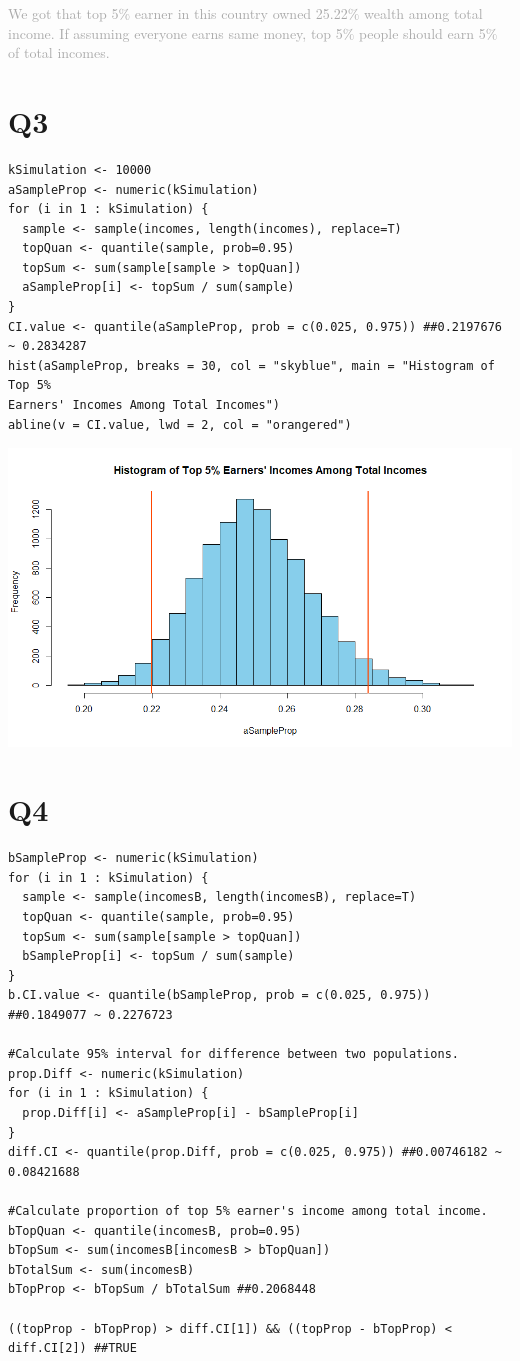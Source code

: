 \documentclass[12pt]{article}
\begin{document}
\noindent \textcolor{darkgray}{We got that top 5$\%$ earner in this country owned 25.22$\%$ wealth among total income. If assuming everyone earns same money, top 5$\%$ people should earn 5$\%$ of total incomes.}

\section*{Q3}
\begin{verbatim}
kSimulation <- 10000
aSampleProp <- numeric(kSimulation)
for (i in 1 : kSimulation) {
  sample <- sample(incomes, length(incomes), replace=T)
  topQuan <- quantile(sample, prob=0.95)
  topSum <- sum(sample[sample > topQuan])
  aSampleProp[i] <- topSum / sum(sample)
}
CI.value <- quantile(aSampleProp, prob = c(0.025, 0.975)) ##0.2197676 ~ 0.2834287
hist(aSampleProp, breaks = 30, col = "skyblue", main = "Histogram of Top 5% 
Earners' Incomes Among Total Incomes")
abline(v = CI.value, lwd = 2, col = "orangered")
\end{verbatim}

\includegraphics[width=6.5in]{Hist-top005.png}

\section*{Q4}
\begin{verbatim}
bSampleProp <- numeric(kSimulation) 
for (i in 1 : kSimulation) {
  sample <- sample(incomesB, length(incomesB), replace=T)
  topQuan <- quantile(sample, prob=0.95)
  topSum <- sum(sample[sample > topQuan])
  bSampleProp[i] <- topSum / sum(sample)
}
b.CI.value <- quantile(bSampleProp, prob = c(0.025, 0.975)) ##0.1849077 ~ 0.2276723

#Calculate 95% interval for difference between two populations.
prop.Diff <- numeric(kSimulation)
for (i in 1 : kSimulation) {
  prop.Diff[i] <- aSampleProp[i] - bSampleProp[i]
}
diff.CI <- quantile(prop.Diff, prob = c(0.025, 0.975)) ##0.00746182 ~ 0.08421688

#Calculate proportion of top 5% earner's income among total income.
bTopQuan <- quantile(incomesB, prob=0.95) 
bTopSum <- sum(incomesB[incomesB > bTopQuan]) 
bTotalSum <- sum(incomesB) 
bTopProp <- bTopSum / bTotalSum ##0.2068448

((topProp - bTopProp) > diff.CI[1]) && ((topProp - bTopProp) < diff.CI[2]) ##TRUE
\end{verbatim}
\end{document}
